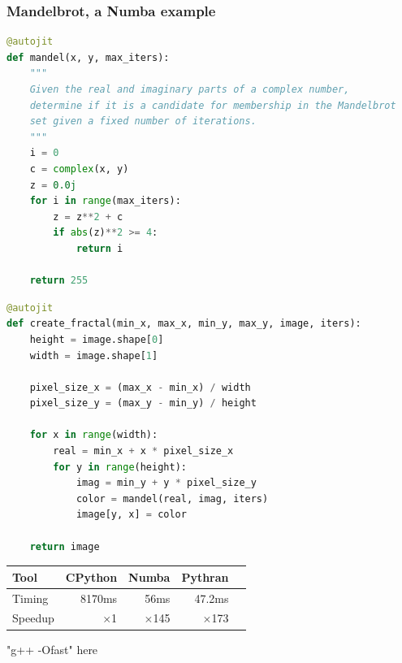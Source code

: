 \documentclass[aspectratio=1610]{beamer}
\begin{document}
\begin{frame}[fragile]
    \frametitle{Mandelbrot, a Numba example}
    \begin{minipage}{0.49\textwidth}
\begin{lstlisting}[language=Python,frame=none,backgroundcolor=\color{white},basicstyle=\ttfamily\tiny]
@autojit
def mandel(x, y, max_iters):
    """
    Given the real and imaginary parts of a complex number,
    determine if it is a candidate for membership in the Mandelbrot
    set given a fixed number of iterations.
    """
    i = 0
    c = complex(x, y)
    z = 0.0j
    for i in range(max_iters):
        z = z**2 + c
        if abs(z)**2 >= 4:
            return i

    return 255
    \end{lstlisting}
\end{minipage}
\begin{minipage}{0.49\textwidth} \begin{lstlisting}[language=Python,frame=none,backgroundcolor=\color{white},basicstyle=\ttfamily\tiny]
@autojit
def create_fractal(min_x, max_x, min_y, max_y, image, iters):
    height = image.shape[0]
    width = image.shape[1]

    pixel_size_x = (max_x - min_x) / width
    pixel_size_y = (max_y - min_y) / height
    
    for x in range(width):
        real = min_x + x * pixel_size_x
        for y in range(height):
            imag = min_y + y * pixel_size_y
            color = mandel(real, imag, iters)
            image[y, x] = color

    return image
\end{lstlisting}
\end{minipage}
    \vfill
    \begin{tabular}{|l|r|r|r|r|}
        \hline
     Tool    &  CPython    &   Numba    &   Pythran  \\
        \hline
     Timing  &  8170ms   &    56ms       &   47.2ms  \\
        \hline
     Speedup & $\times$1 & $\times$145 & $\times$173 \\
    \hline
\end{tabular}

\scriptsize{"g++ -Ofast" here}
\end{frame}
\end{document}
